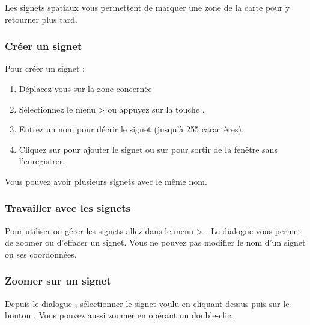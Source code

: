 Les signets spatiaux vous permettent de marquer une zone de la carte pour y retourner plus tard.

\subsubsection{Créer un signet}
Pour créer un signet :
\begin{enumerate}
\item Déplacez-vous sur la zone concernée
\item Sélectionnez le menu  >  ou appuyez sur la touche .
\item Entrez un nom pour décrir le signet (jusqu'à 255 caractères).
\item Cliquez sur  pour ajouter le signet ou sur  pour sortir de la fenêtre sans l'enregistrer.
\end{enumerate}

Vous pouvez avoir plusieurs signets avec le même nom.

%

\subsubsection{Travailler avec les signets}
Pour utiliser ou gérer les signets allez dans le menu  > .
Le dialogue  vous permet de zoomer ou d'effacer un signet.
Vous ne pouvez pas modifier le nom d'un signet ou ses coordonnées.

\subsubsection{Zoomer sur un signet}
Depuis le dialogue , sélectionner le signet voulu en cliquant dessus puis sur le bouton . Vous pouvez aussi zoomer en opérant un double-clic.

